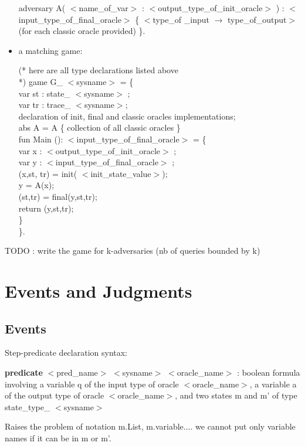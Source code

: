 \documentclass[11pt]{article}
\renewcommand{\textit}[1]{ $<$#1$>$}
\begin{document}
\begin{itemize}
adversary  A( \textit{name\_of\_var} : 
\textit{output\_type\_of\_init\_oracle} )  : 
\textit{input\_type\_of\_final\_oracle}
 \{ \textit{type\_of \_input $\rightarrow$ type\_of\_output} (for each classic
oracle provided) \}.

\item a matching game: 

(* here are all type declarations listed above\\ *)
game G\_{\textit{sysname}} = \{ \\
var st : state\_\textit{sysname} ; \\
var tr : trace\_\textit{sysname}; \\
declaration of init, final and classic oracles implementations; \\
abs A = A \{ collection of all classic oracles \} \\
fun Main (): \textit{input\_type\_of\_final\_oracle} = \{ \\
 var x : \textit{output\_type\_of\_init\_oracle} ; \\
 var y : \textit{input\_type\_of\_final\_oracle} ; \\
 (x,st, tr) = init(\textit{init\_state\_value}); \\
 y = A(x); \\
 (st,tr) = final(y,st,tr); \\
 return (y,st,tr);  \\
\} \\
\}. 
\end{itemize}

TODO : write the game for k-adversaries (nb of queries bounded
by k) 

\section{Events and Judgments}
\subsection{Events}
Step-predicate declaration syntax:

\textbf{predicate} \textit{pred\_name} \textit{sysname} \textit{oracle\_name} : 
boolean formula involving a variable q of the input type of oracle
\textit{oracle\_name}, 
a variable a of the output type of oracle
\textit{oracle\_name}, 
and two states m and m' of type state\_type\_\textit{sysname}

Raises the problem of notation m.List, m.variable.... we cannot put 
only variable names if it can be in m or m'. 
\end{document}
